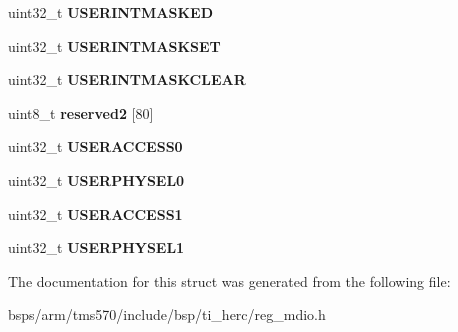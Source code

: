 \begin{DoxyCompactItemize}
uint32\+\_\+t {\bfseries U\+S\+E\+R\+I\+N\+T\+M\+A\+S\+K\+ED}
\item 
\mbox{\label{structtms570__mdio__t_a251eeb8b8203b0ef2586b6a4597ec8db}} 
uint32\+\_\+t {\bfseries U\+S\+E\+R\+I\+N\+T\+M\+A\+S\+K\+S\+ET}
\item 
\mbox{\label{structtms570__mdio__t_a105a13cc12582ec8be25108da0c1d681}} 
uint32\+\_\+t {\bfseries U\+S\+E\+R\+I\+N\+T\+M\+A\+S\+K\+C\+L\+E\+AR}
\item 
\mbox{\label{structtms570__mdio__t_ae21f496956f303429fbfdce1b504f71a}} 
uint8\+\_\+t {\bfseries reserved2} \mbox{[}80\mbox{]}
\item 
\mbox{\label{structtms570__mdio__t_ab6a8a5487ee5191a9f038f934c748f23}} 
uint32\+\_\+t {\bfseries U\+S\+E\+R\+A\+C\+C\+E\+S\+S0}
\item 
\mbox{\label{structtms570__mdio__t_af9d07747297b16434f6b1aaec5cf8bfa}} 
uint32\+\_\+t {\bfseries U\+S\+E\+R\+P\+H\+Y\+S\+E\+L0}
\item 
\mbox{\label{structtms570__mdio__t_ac8fd17715dc651fcd57634c4aaea5691}} 
uint32\+\_\+t {\bfseries U\+S\+E\+R\+A\+C\+C\+E\+S\+S1}
\item 
\mbox{\label{structtms570__mdio__t_ae6a0e86b79785d7b3fc6fc400a831210}} 
uint32\+\_\+t {\bfseries U\+S\+E\+R\+P\+H\+Y\+S\+E\+L1}
\end{DoxyCompactItemize}


The documentation for this struct was generated from the following file\+:\begin{DoxyCompactItemize}
\item 
bsps/arm/tms570/include/bsp/ti\+\_\+herc/reg\+\_\+mdio.\+h\end{DoxyCompactItemize}
